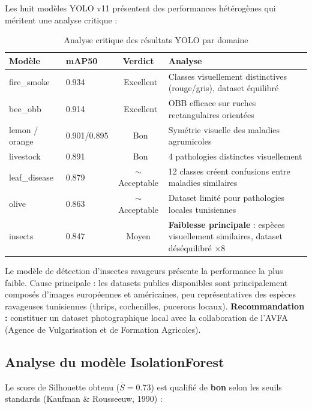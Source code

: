 \documentclass[12pt,a4paper,oneside]{report}
\newcommand{\yes}{\ding{52}}
\begin{document}
Les huit modèles YOLO v11 présentent des performances hétérogènes qui méritent une
analyse critique :

\begin{table}[H]\centering
\caption{Analyse critique des résultats YOLO par domaine}
\label{tab:yolo_discuss}
\small
\begin{tabular}{llcp{5.5cm}}
\toprule
\textbf{Modèle}&\textbf{mAP50}&\textbf{Verdict}&\textbf{Analyse}\\
\midrule
fire\_smoke    & 0.934 & \yes~Excellent  & Classes visuellement distinctives (rouge/gris), dataset équilibré \\
bee\_obb       & 0.914 & \yes~Excellent  & OBB efficace sur ruches rectangulaires orientées \\
lemon / orange & 0.901/0.895 & \yes~Bon & Symétrie visuelle des maladies agrumicoles \\
livestock      & 0.891 & \yes~Bon        & 4 pathologies distinctes visuellement \\
leaf\_disease  & 0.879 & $\sim$ Acceptable & 12 classes créent confusions entre maladies similaires \\
olive          & 0.863 & $\sim$ Acceptable & Dataset limité pour pathologies locales tunisiennes \\
insects        & 0.847 & \textcolor{farmorange}{Moyen} & \textbf{Faiblesse principale} : espèces visuellement similaires, dataset déséquilibré ×8 \\
\bottomrule
\end{tabular}
\end{table}

\begin{tcolorbox}[warningbox,title={Limite YOLO : modèle insects (mAP50 = 0.847)}]
Le modèle de détection d'insectes ravageurs présente la performance la plus faible.
Cause principale : les datasets publics disponibles sont principalement composés d'images
européennes et américaines, peu représentatives des espèces ravageuses tunisiennes
(thrips, cochenilles, pucerons locaux). \textbf{Recommandation :} constituer un dataset
photographique local avec la collaboration de l'AVFA (Agence de Vulgarisation et de
Formation Agricoles).
\end{tcolorbox}

\subsection{Analyse du modèle IsolationForest}

Le score de Silhouette obtenu ($\bar{S} = 0.73$) est qualifié de \textbf{bon} selon
les seuils standards (Kaufman \& Rousseeuw, 1990) :
\end{document}
